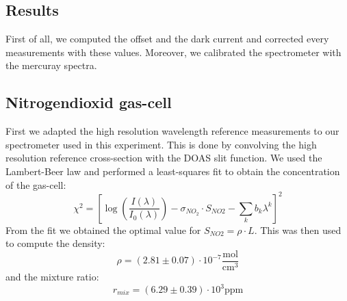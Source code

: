 \documentclass[12pt, english]{scrartcl} %
\begin{document}
\begin{multicols}{2}
\section{Results}
First of all, we computed the offset and the dark current and corrected every measurements with these values. Moreover, we calibrated the spectrometer with the mercuray spectra. 
\subsection{Nitrogendioxid gas-cell}
First we adapted the high resolution wavelength reference measurements to our spectrometer used in this experiment. This is done by convolving the high resolution reference cross-section with the DOAS slit function. We used the Lambert-Beer law and performed a least-squares fit to obtain the concentration of the gas-cell:
\begin{equation}
\chi^2 = [\log(\frac{I(\lambda)}{I_0(\lambda)})- \sigma_{NO_2} \cdot S_{NO2} - \sum_k b_k \lambda^k ]^2
\end{equation}
From the fit we obtained the optimal value for $S_{NO2}= \rho \cdot L$. This was then used to compute the density:
\begin{equation}
\rho = (2.81 \pm 0.07 ) \cdot 10^{-7} \frac{\text{mol}}{\text{cm}^3}
\end{equation}
and the mixture ratio:
\begin{equation}
r_{mix} = (6.29 \pm 0.39) \cdot 10^3 \text{ppm}
\end{equation}

\end{multicols}
\end{document}
